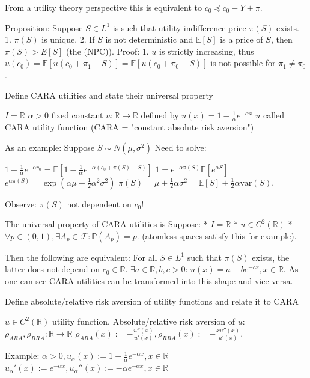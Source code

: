 \documentclass[11pt,a4paper,twoside]{article}
\begin{document}
From a utility theory perspective this is equivalent to \( c_0 \preceq c_0 - Y + \pi \).

Proposition:
Suppose \( S \in L^1 \) is such that utility indifference price \( π(S) \) exists.
1. \( π(S) \) is unique.
2. If \( S \) is not deterministic and \( \mathbb{E}[S] \) is a price of \( S \), then \( π(S) > E[S] \) (the (NPC)).
Proof:
1. \( u \) is strictly increasing, thus \( u(c_0) = \mathbb{E}[u(c_0 + \pi_1 - S)] = \mathbb{E}[u(c_0 + \pi_0 - S)] \)
is not possible for \( \pi_1 \neq \pi_0 \).


Define CARA utilities and state their universal property

\(I = \mathbb{R}\)
\(\alpha > 0\) fixed constant
\(u: \mathbb{R} \rightarrow \mathbb{R}\) defined by \(u(x) = 1 - \frac{1}{\alpha} e^{-\alpha x}\)
\(u\) called CARA utility function (CARA = "constant absolute risk aversion")

As an example:
Suppose \(S \sim N(\mu, \sigma^2)\)
Need to solve:

\(1 - \frac{1}{\alpha} e^{-\alpha c_0} = \mathbb{E} \left[ 1 - \frac{1}{\alpha} e^{-\alpha (c_0 + \pi(S) - S)} \right]\)
\(1 = e^{-\alpha \pi(S)} \mathbb{E} \left[ e^{\alpha S} \right]\)
\(e^{\alpha \pi(S)} = \exp \left( \alpha \mu + \frac{1}{2} \alpha^2 \sigma^2 \right)\)
\(\pi(S) = \mu + \frac{1}{2} \alpha \sigma^2 = \mathbb{E}[S] + \frac{1}{2} \alpha \text{var}(S).\)

Observe: \(\pi(S)\) not dependent on \(c_0\)!

The universal property of CARA utilities is 
Suppose:
* \(I = \mathbb{R}\)
* \(u \in C^2(\mathbb{R})\)
* \(\forall p \in (0, 1), \exists A_p \in \mathcal{F}: \mathbb{P}(A_p) = p.\)
(atomless spaces satisfy this for example).

Then the following are equivalent:
For all \(S \in L^1\) such that \(\pi(S)\) exists, the latter does not depend on \(c_0 \in \mathbb{R}\).
\(\exists a \in \mathbb{R}, b, c > 0\): \(u(x) = a - be^{-cx}, x \in \mathbb{R}\).
As one can see CARA utilities can be transformed into this shape and vice versa.


Define absolute/relative risk aversion of utility functions
and relate it to CARA

\(u \in C^2(\mathbb{R})\) utility function. Absolute/relative risk aversion of \(u\):
\(\rho_{ARA}, \rho_{RRA}: \mathbb{R} \rightarrow \mathbb{R}\)
\(\rho_{ARA}(x) := -\frac{u''(x)}{u'(x)}, \rho_{RRA}(x) := -\frac{xu''(x)}{u'(x)}.\)

Example:
\(\alpha > 0, u_\alpha(x) := 1 - \frac{1}{\alpha} e^{-\alpha x}, x \in \mathbb{R}\)
\(u_\alpha'(x) := e^{-\alpha x}, u_\alpha''(x) := -\alpha e^{-\alpha x}, x \in \mathbb{R}\)
\end{document}
